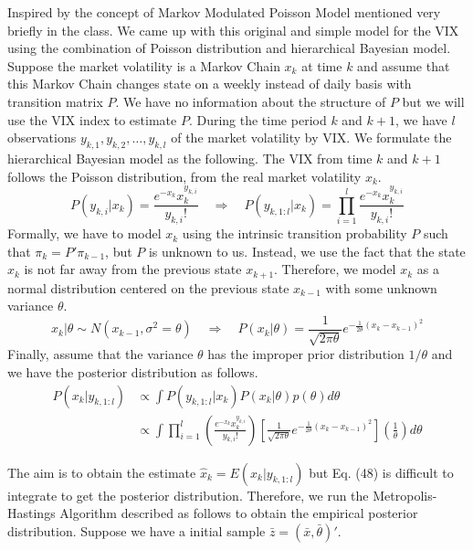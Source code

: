 \documentclass[a4paper, 11pt]{article}
\begin{document}
Inspired by the concept of Markov Modulated Poisson Model mentioned very briefly in the class. We came up with this original and simple model for the VIX using the combination of Poisson distribution and hierarchical Bayesian model. Suppose the market volatility is a Markov Chain $x_k$ at time $k$ and assume that this Markov Chain changes state on a weekly instead of daily basis with transition matrix $P$. We have no information about the structure of $P$ but we will use the VIX index to estimate $P$. During the time period $k$ and $k+1$, we have $l$ observations $y_{k,1}, y_{k,2}, \dots, y_{k,l}$ of the market volatility by VIX. We formulate the hierarchical Bayesian model as the following. The VIX from time $k$ and $k+1$ follows the Poisson distribution, from the real market volatility $x_k$. 
\begin{equation}
P(y_{k,i}|x_k) = \frac{e^{-x_k}x_k^{y_{k,i}}}{y_{k,i}!} \quad \Longrightarrow \quad P(y_{k,1:l}|x_k) = \prod_{i=1}^l\frac{e^{-x_k}x_k^{y_{k,i}}}{y_{k,i}!}
\end{equation}
Formally, we have to model $x_k$ using the intrinsic transition probability $P$  such that $\pi_{k} = P'\pi_{k-1}$, but $P$ is unknown to us. Instead, we use the fact that the state $x_k$ is not far away from the previous state $x_{k+1}$. Therefore, we model $x_k$ as a normal distribution centered on the previous state $x_{k-1}$ with some unknown variance $\theta$. 
\begin{equation}
x_k|\theta \sim N(x_{k-1}, \sigma^2=\theta) \quad \Longrightarrow \quad P(x_k|\theta) = \frac{1}{\sqrt{2\pi\theta}}e^{-\frac{1}{2\theta}(x_k - x_{k-1})^2}
\end{equation}
Finally, assume that the variance $\theta$ has the improper prior distribution $1/\theta$ and we have the posterior distribution as follows.
\begin{equation}
\begin{split}
P(x_k|y_{k,1:l}) & \propto \int P(y_{k,1:l}|x_k)P(x_k|\theta)p(\theta)d\theta\\
 & \propto \int \prod_{i=1}^l\left( \frac{e^{-x_k}x_k^{y_{k,i}}}{y_{k,i}!}\right) \left[\frac{1}{\sqrt{2\pi\theta}}e^{-\frac{1}{2\theta}(x_k - x_{k-1})^2}\right] \left(\frac{1}{\theta}\right)d\theta
\end{split}
\end{equation}

The aim is to obtain the estimate $\hat{x}_k = E(x_k|y_{k,1:l})$ but Eq. (48) is difficult to integrate to get the posterior distribution. Therefore, we run the Metropolis-Hastings Algorithm described as follows to obtain the empirical posterior distribution. Suppose we have a initial sample $\bar{z} = (\bar{x}, \bar{\theta})'$. 
\end{document}
